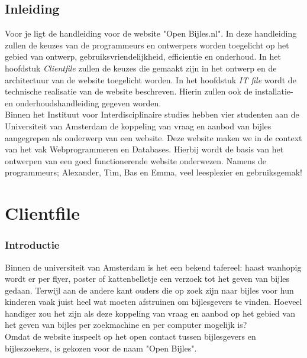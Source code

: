 \documentclass{report}
\begin{document}
    \tableofcontents

    \section*{Inleiding}
        Voor je ligt de handleiding voor de website "Open Bijles.nl". In deze handleiding zullen de keuzes van de programmeurs en ontwerpers worden toegelicht op het gebied van ontwerp, gebruiksvriendelijkheid, efficientie en onderhoud. In het hoofdstuk \emph{Clientfile} zullen de keuzes die gemaakt zijn in het ontwerp en de architectuur van de website toegelicht worden. In het hoofdstuk \emph{IT file} wordt de technische realisatie van de website beschreven. Hierin zullen ook de installatie- en onderhoudshandleiding gegeven worden.\\
        
        Binnen het Instituut voor Interdisciplinaire studies hebben vier studenten aan de Universiteit van Amsterdam de koppeling van vraag en aanbod van bijles aangegrepen als onderwerp van een website. Deze website maken we in de context van het vak Webprogrammeren en Databases. Hierbij wordt de basis van het ontwerpen van een goed functionerende website onderwezen. Namens de programmeurs; Alexander, Tim, Bas en Emma, veel leesplezier en gebruiksgemak!

    \chapter{Clientfile}
        \subsection*{Introductie}
            Binnen de universiteit van Amsterdam is het een bekend tafereel: haast wanhopig wordt er per flyer, poster of kattenbelletje een verzoek tot het geven van bijles gedaan. Terwijl aan de andere kant ouders die op zoek zijn naar bijles voor hun kinderen vaak juist heel wat moeten afstruinen om bijlesgevers te vinden. Hoeveel handiger zou het zijn als deze koppeling van vraag en aanbod op het gebied van het geven van bijles per zoekmachine en per computer mogelijk is? \\
            
            Omdat de website inspeelt op het open contact tussen bijlesgevers en bijleszoekers, is gekozen voor de naam "Open Bijles".\\
        
\end{document}
